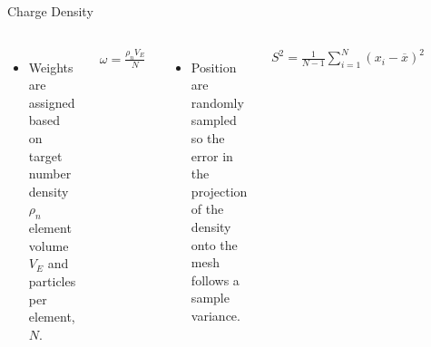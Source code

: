 \documentclass[aspectratio=169, 16pt]{beamer}
\begin{document}
\begin{frame}{Charge Density}
  \vspace{1cm}
  \begin{columns}
      \begin{itemize}
          \item Weights are assigned based on target number density $\rho_n$ element volume $V_E$ and particles per element, $N$.
      \end{itemize}
      \begin{align*}
        \omega = 
        \frac{\rho_n V_E}{N}
      \end{align*}
      \begin{itemize}
      \item Position are randomly sampled so the error in the projection of the density onto the mesh follows a sample variance.
      \end{itemize}
      \begin{align*}
        S^2 = 
        \frac{ 1 }{ N - 1 }
        \sum_{i=1}^N 
        \left( x_i - \overline{x} \right)^2
      \end{align*}
      \centering 
      \begin{figure}
        \centering 
        \includegraphics[height=0.7\textheight]{figs/density_error.png}
      \end{figure}
  \end{columns}
\end{frame}
\end{document}
